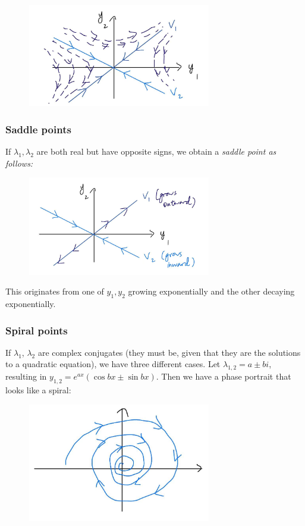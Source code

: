 \documentclass{article}
\begin{document}
\begin{figure}[h]
    \centering
    \includegraphics[width=8cm]{DE-ch4-stablesink-2.jpg}
\end{figure}\subsubsection*{Saddle points}
If $\lambda_1, \lambda_2$ are both real but have opposite signs, we obtain a \it saddle point \normalfont as follows:

\begin{figure}[h]
    \centering
    \includegraphics[width=8cm]{DE-ch4-saddlenode.jpg}
\end{figure}

This originates from one of $y_1, y_2$ growing exponentially and the other decaying exponentially. 
\subsubsection*{Spiral points}
If $\lambda_1$, $\lambda_2$ are complex conjugates (they must be, given that they are the solutions to a quadratic equation), we have three different cases. Let $\lambda_{1,2} = a \pm bi$, resulting in $y_{1,2} = e^{ax}(\cos{bx}\pm\sin{bx})$. Then we have a phase portrait that looks like a spiral: 

\begin{figure}[h]
    \centering
    \includegraphics[width=8cm]{DE-ch4-spiral.jpg}
\end{figure}
\end{document}
